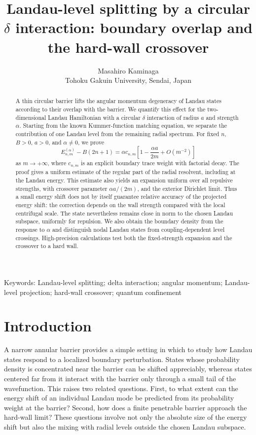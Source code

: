 \documentclass[12pt,a4paper]{article}
\title{Landau-level splitting by a circular $\delta$ interaction: boundary overlap and the hard-wall crossover}
\author{Masahiro Kaminaga\\
Tohoku Gakuin University, Sendai, Japan}
\date{}
\numberwithin{equation}{section}
\theoremstyle{remark}
\theoremstyle{definition}
\begin{document}
\maketitle

\begin{abstract}
A thin circular barrier lifts the angular momentum degeneracy of Landau
states according to their overlap with the barrier. We quantify this effect
for the two-dimensional Landau Hamiltonian with a circular $\delta$
interaction of radius $a$ and strength $\alpha$. Starting from the known
Kummer-function matching equation, we separate the contribution of one
Landau level from the remaining radial spectrum. For fixed $n$, $B>0$,
$a>0$, and $\alpha\ne0$, we prove
$$
E_{n,m}^{(\alpha)}-B(2n+1)
=\alpha c_{n,m}\left[1-\frac{\alpha a}{2m}+O(m^{-2})\right]
$$
as $m\to+\infty$, where $c_{n,m}$ is an explicit boundary trace
weight with factorial decay. The proof gives a uniform estimate of the
regular part of the radial resolvent, including at the Landau energy.
This estimate also yields an expansion uniform over all repulsive strengths,
with crossover parameter $\alpha a/(2m)$, and the exterior Dirichlet limit.
Thus a small energy shift does not by itself guarantee relative accuracy
of the projected energy shift: the correction depends on the wall strength
compared with the local centrifugal scale. The state nevertheless remains
close in norm to the chosen Landau subspace, uniformly for repulsion.
We also obtain the boundary density from the response to $\alpha$ and
distinguish nodal Landau states from coupling-dependent level crossings.
High-precision calculations test both the fixed-strength expansion and
the crossover to a hard wall.
\end{abstract}



\medskip
\noindent Keywords: Landau-level splitting; delta interaction; angular momentum; Landau-level projection; hard-wall crossover; quantum confinement

\section{Introduction}\label{sec:intro}

A narrow annular barrier provides a simple setting in which to study how
Landau states respond to a localized boundary perturbation.  States whose
probability density is concentrated near the barrier can be shifted
appreciably, whereas states centered far from it interact with the barrier
only through a small tail of the wavefunction.  This raises two related
questions.  First, to what extent can the energy shift of an individual
Landau mode be predicted from its probability weight at the barrier?
Second, how does a finite penetrable barrier approach the hard-wall limit?
These questions involve not only the absolute size of the energy shift but
also the mixing with radial levels outside the chosen Landau subspace.
\end{document}
